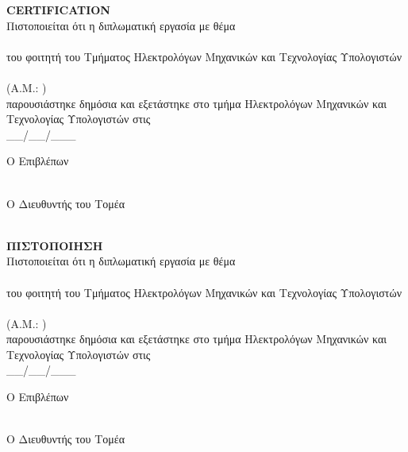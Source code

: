 \pagestyle{empty}
\begin{center}
{\LARGE \textbf{CERTIFICATION}\\[1cm]}
\large Πιστοποιείται ότι η διπλωματική εργασία με θέμα\\[1cm]
\textbf{\large \thesistitle }\\[1cm]
του φοιτητή του Τμήματος Ηλεκτρολόγων Μηχανικών και Τεχνολογίας Υπολογιστών\\[1.5cm]
\me \\[0.5cm]
(Α.Μ.: \studnum )\\[1.5cm]
παρουσιάστηκε δημόσια και εξετάστηκε στο τμήμα  Ηλεκτρολόγων Μηχανικών και Τεχνολογίας Υπολογιστών στις\\[1cm]
\Large{\_\_/\_\_/\_\_\_}\\[1.5cm]
\end{center}
\begin{minipage}{0.5\textwidth}
\begin{flushleft} \large
Ο Επιβλέπων\\[4cm]
\supname \\
\emph{\suptitle}
\end{flushleft}
\end{minipage}
\begin{minipage}{0.5\textwidth}
\begin{flushright} \large
Ο Διευθυντής του Τομέα\\[4cm]
\headofdivision\\
\emph{\headofdivisiontitle}
\end{flushright}
\end{minipage}

\newpage
\pagestyle{empty}
\begin{center}
{\LARGE \textbf{ΠΙΣΤΟΠΟΙΗΣΗ}\\[1cm]}
\large Πιστοποιείται ότι η διπλωματική εργασία με θέμα\\[1cm]
\textbf{\large \thesistitle }\\[1cm]
του φοιτητή του Τμήματος Ηλεκτρολόγων Μηχανικών και Τεχνολογίας Υπολογιστών\\[1.5cm]
\me \\[0.5cm]
(Α.Μ.: \studnum )\\[1.5cm]
παρουσιάστηκε δημόσια και εξετάστηκε στο τμήμα  Ηλεκτρολόγων Μηχανικών και Τεχνολογίας Υπολογιστών στις\\[1cm]
\Large{\_\_/\_\_/\_\_\_}\\[1.5cm]
\end{center}
\begin{minipage}{0.5\textwidth}
\begin{flushleft} \large
Ο Επιβλέπων\\[4cm]
\supname \\
\emph{\suptitle}
\end{flushleft}
\end{minipage}
\begin{minipage}{0.5\textwidth}
\begin{flushright} \large
Ο Διευθυντής του Τομέα\\[4cm]
\headofdivision\\
\emph{\headofdivisiontitle}
\end{flushright}
\end{minipage}